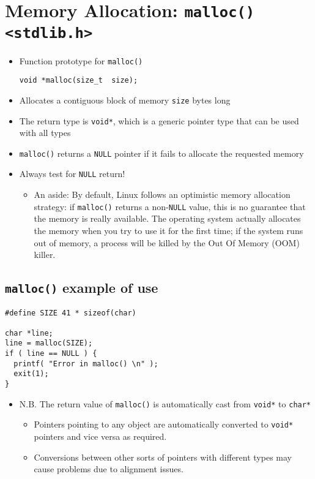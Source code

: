 \documentclass{article}
\begin{document}
\section{Memory Allocation: \texttt{malloc() <stdlib.h>}}
\begin{itemize}
\item Function prototype for \verb!malloc()!
\begin{verbatim}
void *malloc(size_t  size);
\end{verbatim}
\item Allocates a contiguous block of memory \verb!size! bytes long
\item The return type is \verb!void*!, which is a generic pointer type that can be used with all types
\item \verb!malloc()! returns a \verb!NULL! pointer if it fails to allocate the requested memory
\item Always test for \verb!NULL! return!
\begin{itemize}
\item An aside: By default, Linux follows an optimistic memory allocation strategy: if \verb!malloc()! returns a non-\verb!NULL! value, this is no guarantee that the memory is really available.
The operating system actually allocates the memory when you try to use it for the first time; if the system runs out of memory, a process will be killed by the Out Of Memory (OOM) killer.
\end{itemize}
\end{itemize}



\subsection{\texttt{malloc()} example of use}
\begin{verbatim}
#define SIZE 41 * sizeof(char)

char *line; 
line = malloc(SIZE);
if ( line == NULL ) {
  printf( "Error in malloc() \n" );
  exit(1);
}
\end{verbatim}

\begin{itemize}
\item N.B. The return value of \verb!malloc()! is automatically cast from \verb!void*! to \verb!char*!
\begin{itemize}
\item Pointers pointing to any object are automatically converted to \verb!void*! pointers and vice versa as required.
\item Conversions between other sorts of pointers with different types may cause problems due to alignment issues.
\end{itemize}
\end{itemize}
\end{document}

